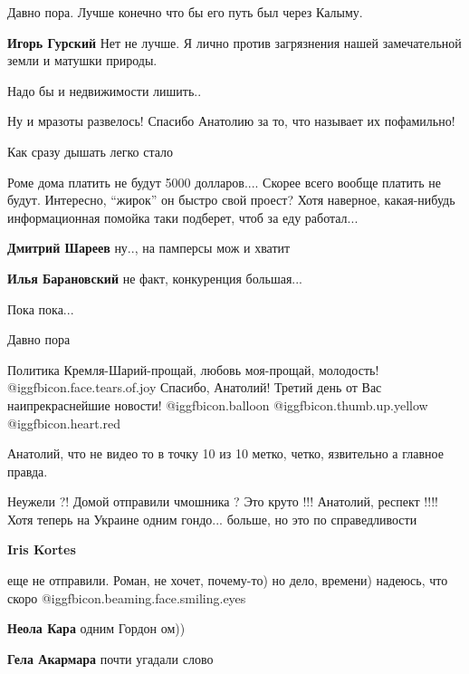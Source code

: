 \begin{itemize}
Давно пора. Лучше конечно что бы его путь был через Калыму.

\textbf{Игорь Гурский} Нет не лучше. Я лично против загрязнения нашей замечательной земли и матушки природы.

Надо бы и недвижимости лишить..

Ну и мразоты развелось! Спасибо Анатолию за то, что называет их пофамильно!

Как сразу дышать легко стало


Роме дома платить не будут 5000 долларов.... Скорее всего вообще платить не
будут. Интересно, \enquote{жирок} он быстро свой проест? Хотя наверное, какая-нибудь
информационная помойка таки подберет, чтоб за еду работал...

\begin{itemize} %
\textbf{Дмитрий Шареев} ну.., на памперсы мож и хватит

\textbf{Илья Барановский} не факт, конкуренция большая...
\end{itemize} %

Пока пока...

Давно пора

Политика Кремля-Шарий-прощай, любовь моя-прощай, молодость!  @igg{fbicon.face.tears.of.joy} Спасибо, Анатолий!
Третий день от Вас наипрекраснейшие новости!  @igg{fbicon.balloon}  @igg{fbicon.thumb.up.yellow} @igg{fbicon.heart.red}

Анатолий, что не видео то в точку 10 из 10 метко, четко, язвительно а главное правда.


Неужели ?! Домой отправили чмошника ? Это круто !!! Анатолий, респект !!!! Хотя
теперь на Украине одним гондо... больше, но это по справедливости

\begin{itemize} %
\textbf{Iris Kortes} 

еще не отправили. Роман, не хочет, почему-то) но дело, времени) надеюсь, что
скоро @igg{fbicon.beaming.face.smiling.eyes} 

\textbf{Неола Кара} одним Гордон ом))

\textbf{Гела Акармара} почти угадали слово


\end{itemize}
\end{itemize}
